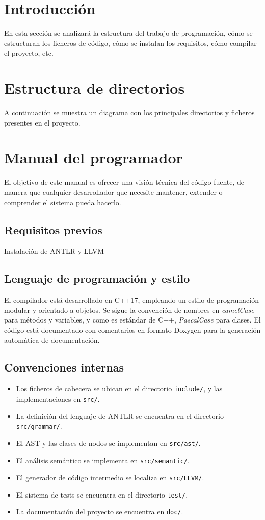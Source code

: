 
\section{Introducción}
En esta sección se analizará la estructura del trabajo de programación, cómo se estructuran los ficheros de código, cómo se instalan los requisitos, cómo compilar el proyecto, etc.

\section{Estructura de directorios}
A continuación se muestra un diagrama con los principales directorios y ficheros presentes en el proyecto.

\section{Manual del programador}
El objetivo de este manual es ofrecer una visión técnica del código fuente, de manera que cualquier desarrollador que necesite mantener, extender o comprender el sistema pueda hacerlo.

\subsection{Requisitos previos}
Instalación de ANTLR y LLVM %

\subsection{Lenguaje de programación y estilo}
El compilador está desarrollado en C++17, empleando un estilo de programación modular y orientado a objetos. Se sigue la convención de nombres en \textit{camelCase} para métodos y variables, y como es estándar de C++, \textit{PascalCase} para clases. El código está documentado con comentarios en formato Doxygen para la generación automática de documentación.

\subsection{Convenciones internas}
\begin{itemize}
  \item Los ficheros de cabecera se ubican en el directorio \texttt{include/}, y las implementaciones en \texttt{src/}.
  \item La definición del lenguaje de ANTLR se encuentra en el directorio \texttt{src/grammar/}.
  \item El AST y las clases de nodos se implementan en \texttt{src/ast/}.
  \item El análisis semántico se implementa en \texttt{src/semantic/}.
  \item El generador de código intermedio se localiza en \texttt{src/LLVM/}.
  \item El sistema de tests se encuentra en el directorio \texttt{test/}.
  \item La documentación del proyecto se encuentra en \texttt{doc/}.
\end{itemize}


